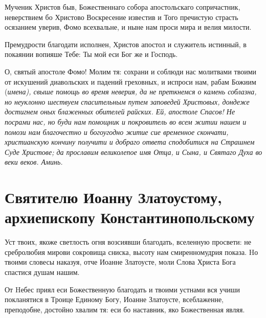 Мученик Христов быв, Божественнаго собора апостольскаго сопричастник, неверствием бо Христово Воскресение известив и Того пречистую страсть осязанием уверив, Фомо всехвальне, и ныне нам проси мира и велия милости.




Премудрости благодати исполнен, Христов апостол и служитель истинный, в покаянии вопияше Тебе: Ты мой еси Бог же и Господь.




О, святый апостоле Фомо! Молим тя: сохрани и соблюди нас молитвами твоими от искушений диавольских и падений греховных, и испроси нам, рабам Божиим (\itshape имена\normalfont{}), свыше помощь во время неверия, да не преткнемся о камень соблазна, но неуклонно шествуем спасительным путем заповедей Христовых, дондеже достигнем оных блаженных обителей райских. Ей, апостоле Спасов! Не посрами нас, но буди нам помощник и покровитель во всем житии нашем и помози нам благочестно и богоугодно житие сие временное скончати, христианскую кончину получити и добраго ответа сподобитися на Страшнем Суде Христове; да прославим великолепое имя Отца, и Сына, и Святаго Духа во веки веков. Аминь.
\mychapterending


 

\section{Святителю Иоанну Златоустому, архиепископу Константинопольскому}
 




Уст твоих, якоже светлость огня возсиявши благодать, вселенную просвети: не сребролюбия мирови сокровища сниска, высоту нам смиренномудрия показа. Hо твоими словесы наказуя, отче Иоанне Златоусте, моли Слова Христа Бога спастися душам нашим.




От Hебес приял еси Божественную благодать и твоими устнами вся учиши покланятися в Троице Единому Богу, Иоанне Златоусте, всеблаженне, преподобне, достойно хвалим тя: еси бо наставник, яко Божественная являя.




